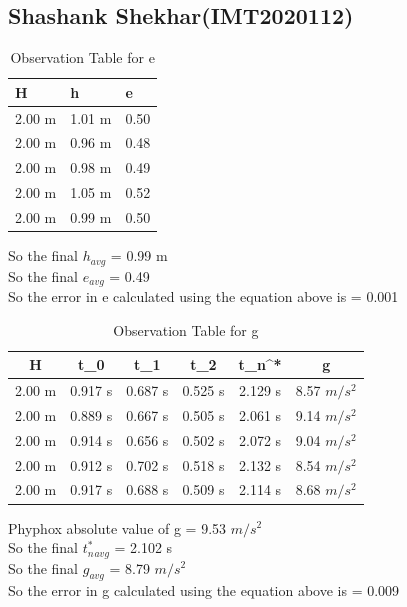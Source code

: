 \documentclass[11pt]{scrartcl} %
\begin{document}
\newpage
\subsection{Shashank Shekhar(IMT2020112)}

\begin{table}[h] %
	\centering %
	\begin{tabular}{l l l}
		\toprule
		\textbf{H} & \textbf{h} & \textbf{e} \\
		\midrule
		2.00 m & 1.01 m & 0.50\\
        2.00 m & 0.96 m  & 0.48\\
        2.00 m & 0.98 m  & 0.49\\
        2.00 m & 1.05 m & 0.52 \\
        2.00 m & 0.99 m & 0.50 \\
		\bottomrule
	\end{tabular}
	\caption{Observation Table for e}
\end{table}
So the final $h_{avg}$ = 0.99 m\\
So the final $e_{avg}$ = 0.49\\
So the error in e calculated using the equation above is  = 0.001

\begin{table}[h]
\centering
\begin{tabular}{||c c c c c c||} 
\toprule
 \hline
 H & t_0 & t_1 & t_2 & t_n^* & g \\ [0.5ex] 
 \midrule
 \hline\hline
 2.00 m & 0.917 s & 0.687 s  & 0.525 s & 2.129 s & 8.57 $m/s^2$  \\ 
 \hline
 2.00 m & 0.889 s & 0.667 s & 0.505 s & 2.061 s & 9.14 $m/s^2$  \\
 \hline 
 2.00 m & 0.914 s & 0.656 s & 0.502 s & 2.072 s  & 9.04 $m/s^2$   \\
 \hline
 2.00 m & 0.912 s & 0.702 s & 0.518 s & 2.132 s  & 8.54 $m/s^2$   \\
 \hline
 2.00 m & 0.917 s & 0.688 s & 0.509 s & 2.114 s  & 8.68 $m/s^2$  \\ 
 [1ex]
 \bottomrule
 \hline
\end{tabular}
\caption{Observation Table for g}
\end{table}
Phyphox absolute value of g = 9.53 $m/s^2$\\
So the final $t_n^*_{avg}$ = 2.102 s\\
So the final $g_{avg}$ = 8.79 $m/s^2$\\
So the error in g calculated using the equation above is  = 0.009\\

\newpage
\end{document}
